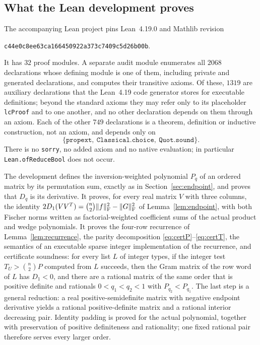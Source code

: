 \subsection{What the Lean development proves}

The accompanying Lean project pins Lean~4.19.0 and Mathlib revision
\begin{center}\small\nolinkurl{c44e0c8ee63ca166450922a373c7409c5d26b00b}.\end{center}
It has $32$ proof modules. A separate audit module enumerates
all $2068$ declarations whose defining module is one of them, including
private and generated declarations, and computes their transitive axioms.
Of these, $1319$ are auxiliary declarations that the Lean~4.19 code
generator stores for executable definitions; beyond the standard axioms
they may refer only to its placeholder \texttt{lcProof} and to one another,
and no other declaration depends on them through an axiom. Each of the other $749$
declarations is a theorem, definition or inductive construction, not an
axiom, and depends only on
\[
 \{\texttt{propext},\ \texttt{Classical.choice},\ \texttt{Quot.sound}\}.
\]
There is no \texttt{sorry}, no added axiom and no native evaluation;
in particular \texttt{Lean.ofReduceBool} does not occur.

The development defines the inversion-weighted polynomial $P_q$ of an
ordered matrix by its permutation sum, exactly as in
Section~\ref{sec:endpoint}, and proves that $D_q$ is its derivative.
It proves, for every real matrix $V$ with three columns, the identity
$2D_1(VV^T)=\binom n2\|f\|_{\mathrm F}^2-\|G\|_{\mathrm F}^2$ of
Lemma~\ref{lem:endpoint}, with both Fischer norms written as
factorial-weighted coefficient sums of the actual product and wedge
polynomials. It proves the four-row recurrence of
Lemma~\ref{lem:recurrence}, the parity decomposition
\eqref{eq:certP}--\eqref{eq:certT}, the semantics of an executable
sparse integer implementation of the recurrence, and certificate
soundness: for every list $L$ of integer types, if the integer test
$T_U>\binom n2P$ computed from $L$ succeeds, then the Gram matrix of the
row word of $L$ has $D_1<0$, and there are a rational matrix of the same
order that is positive definite and rationals $0<q_1<q_2<1$ with
$P_{q_2}<P_{q_1}$. The last step is a general reduction: a real
positive-semidefinite matrix with negative endpoint derivative yields a
rational positive-definite matrix and a rational interior decreasing
pair. Identity padding is proved for the actual polynomial, together
with preservation of positive definiteness and rationality; one fixed
rational pair therefore serves every larger order.

